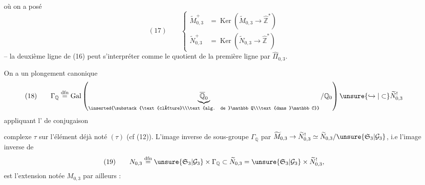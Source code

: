 où on a posé
\[
(17)\qquad
\left\{\begin{aligned}
\widetilde M_{0,3}^{+}&=\operatorname{Ker}(\widetilde M_{0,3}\to\widehat{\mathbb Z}^{*})\\
\widetilde N_{0,3}^{+}&=\operatorname{Ker}(\widetilde N_{0,3}\to\widehat{\mathbb Z}^{*})
\end{aligned}\right.
\]
-- la deuxième ligne de (16) peut s'interpréter comme le quotient de la première ligne par $\widehat\Pi_{0,3}$.

On a un plongement canonique
\[
(18)\qquad
\Gamma_{\mathbb Q}\overset{\mathrm{dfn}}{=}
\operatorname{Gal}\left(
\underbrace{\overline{\mathbb Q}_0}_{\inserted{\substack{\text{clôture}\\\text{alg. de }\mathbb Q\\\text{dans }\mathbb C}}}
/\mathbb Q_0\right)
\unsure{\hookrightarrow|\subset}\widetilde N_{0,3}^{!}
\]
appliquant l' de conjugaison


complexe $\tau$ sur l'élément déjà noté $(\tau)$ (cf (12)). L'image inverse de  sous-groupe $\Gamma_{\mathbb Q}$  par $\widetilde M_{0,3}\to\widetilde N_{0,3}^{!}\simeq\widetilde N_{0,3}/\unsure{\mathfrak S_3|\mathcal G_3}$, i.e l'image inverse de 
\[
(19)\qquad
N_{0,3}\overset{\mathrm{dfn}}{=}
\unsure{\mathfrak S_3|\mathcal G_3}\times\Gamma_{\mathbb Q}
\subset\widetilde N_{0,3}
=\unsure{\mathfrak S_3|\mathcal G_3}\times\widetilde N_{0,3}^{!},
\]
est l'extension  notée $M_{0,3}$ par ailleurs :



